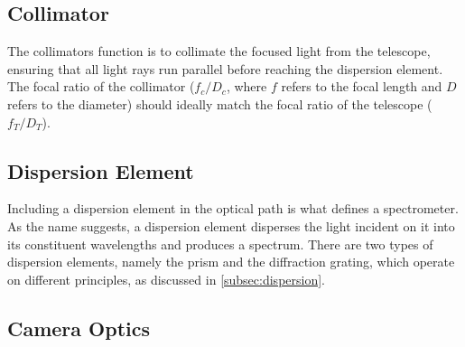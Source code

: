 \subsection{Collimator}

The collimators function is to collimate the focused light from the telescope, ensuring that all light rays run parallel before reaching the dispersion element.
The focal ratio of the collimator ($f_{c} / D_{c}$, where $f$ refers to the focal length and $D$ refers to the diameter) should ideally match the focal ratio of the telescope ($f_{T} / D_{T}$).





\subsection{Dispersion Element}

Including a dispersion element in the optical path is what defines a spectrometer.
As the name suggests, a dispersion element disperses the light incident on it into its constituent wavelengths and produces a spectrum.
There are two types of dispersion elements, namely the prism and the diffraction grating, which operate on different principles, as discussed in \autoref{subsec:dispersion}.

\subsection{Camera Optics}

